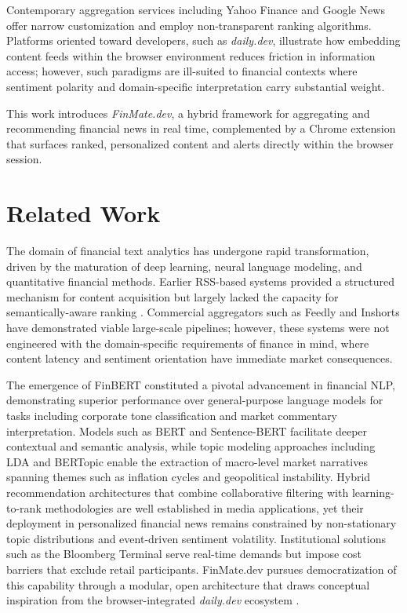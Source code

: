 \documentclass[conference]{IEEEtran}
\begin{document}
Contemporary aggregation services including Yahoo Finance and Google News offer narrow customization and employ non-transparent ranking algorithms. Platforms oriented toward developers, such as \textit{daily.dev}, illustrate how embedding content feeds within the browser environment reduces friction in information access; however, such paradigms are ill-suited to financial contexts where sentiment polarity and domain-specific interpretation carry substantial weight.

This work introduces \textit{FinMate.dev}, a hybrid framework for aggregating and recommending financial news in real time, complemented by a Chrome extension that surfaces ranked, personalized content and alerts directly within the browser session.

\section{Related Work}

The domain of financial text analytics has undergone rapid transformation, driven by the maturation of deep learning, neural language modeling, and quantitative financial methods. Earlier RSS-based systems provided a structured mechanism for content acquisition but largely lacked the capacity for semantically-aware ranking \cite{rss2020}. Commercial aggregators such as Feedly and Inshorts have demonstrated viable large-scale pipelines; however, these systems were not engineered with the domain-specific requirements of finance in mind, where content latency and sentiment orientation have immediate market consequences.

The emergence of FinBERT \cite{araci2019finbert} constituted a pivotal advancement in financial NLP, demonstrating superior performance over general-purpose language models for tasks including corporate tone classification and market commentary interpretation. Models such as BERT \cite{devlin2019bert} and Sentence-BERT \cite{reimers2019sbert} facilitate deeper contextual and semantic analysis, while topic modeling approaches including LDA and BERTopic \cite{grootendorst2022bertopic} enable the extraction of macro-level market narratives spanning themes such as inflation cycles and geopolitical instability. Hybrid recommendation architectures that combine collaborative filtering with learning-to-rank methodologies \cite{burges2005} are well established in media applications, yet their deployment in personalized financial news remains constrained by non-stationary topic distributions and event-driven sentiment volatility. Institutional solutions such as the Bloomberg Terminal serve real-time demands but impose cost barriers that exclude retail participants. FinMate.dev pursues democratization of this capability through a modular, open architecture that draws conceptual inspiration from the browser-integrated \textit{daily.dev} ecosystem \cite{dailydev}.
\end{document}

